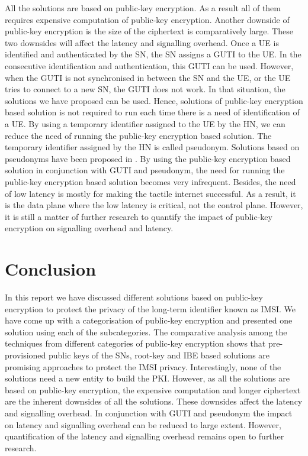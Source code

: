 \documentclass[12pt]{llncs}
\begin{document}
All the solutions are based on public-key encryption. As a result all of them requires expensive computation of public-key encryption. Another downside of public-key encryption is the size of the ciphertext is comparatively large. These two downsides will affect the latency and signalling overhead. Once a UE is identified and authenticated by the SN, the SN assigns a GUTI to the UE. In the consecutive identification and authentication, this GUTI can be used. However, when the GUTI is not synchronised in between the SN and the UE, or the UE tries to connect to a new SN, the GUTI does not work. In that situation, the solutions we have proposed can be used. Hence, solutions of public-key encryption based solution is not required to run each time there is a need of identification of a UE. By using a temporary identifier assigned to the UE by the HN, we can reduce the need of running the public-key encryption based solution. The temporary identifier assigned by the HN is called pseudonym. Solutions based on pseudonyms have been proposed in \cite{pseudonym_valtteri_philip,pseudonym_ericsson}. By using the public-key encryption based solution in conjunction with GUTI and pseudonym, the need for running the public-key encryption based solution becomes very infrequent. Besides, the need of low latency is mostly for making the tactile internet successful. As a result, it is the data plane where the low latency is critical, not the control plane. However, it is still a matter of further research to quantify the impact of public-key encryption on signalling overhead and latency. 



\section{Conclusion}
\label{sec:conclusion}
In this report we have discussed different solutions based on public-key encryption to protect the privacy of the long-term identifier known as IMSI. We have come up with a categorisation of public-key encryption and presented one solution using each of the subcategories. The comparative analysis among the techniques from different categories of public-key encryption shows that pre-provisioned public keys of the SNs, root-key and IBE based solutions are promising approaches to protect the IMSI privacy.
Interestingly, none of the solutions need a new entity to build the PKI. However, as all the solutions are based on public-key encryption, the expensive computation and longer ciphertext are the inherent downsides of all the solutions. These downsides affect the latency and signalling overhead. In conjunction with GUTI and pseudonym the impact on latency and signalling overhead can be reduced to large extent. However, quantification of the latency and signalling overhead remains open to further research.
\end{document}
